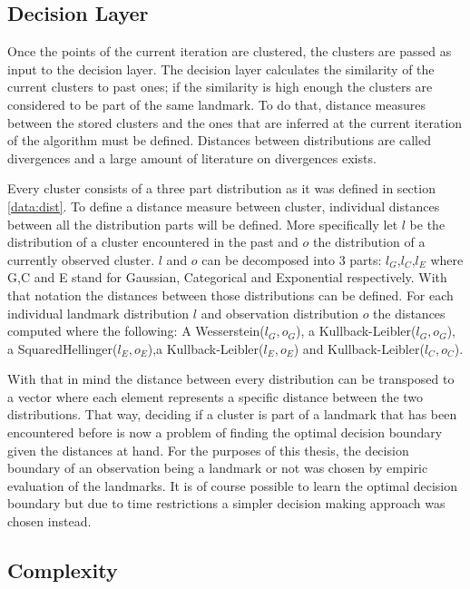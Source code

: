\documentclass[twoside,hidelinks]{article}
\begin{document}
\subsection{Decision Layer}

Once the points of the current iteration are clustered, the clusters are passed as input to the decision layer. The decision layer calculates the similarity of the current clusters to past ones; if the similarity is high enough the clusters are considered to be part of the same landmark. To do that, distance measures between the stored clusters and the ones that are inferred at the current iteration of the algorithm must be defined. Distances between distributions are called divergences and a large amount of literature on divergences exists.

Every cluster consists of a three part distribution as it was defined in section \ref{data:dist}. To define a distance measure between cluster, individual distances between all the distribution parts will be defined. More specifically let $l$ be the distribution of a cluster encountered in the past and $o$ the distribution of a currently observed cluster. $l$ and $o$ can be decomposed into 3 parts: $l_G$,$l_C$,$l_E$ where G,C and E stand for Gaussian, Categorical and Exponential respectively. With that notation the distances between those distributions can be defined. For each individual landmark distribution $l$ and observation distribution $o$ the distances computed where the following: A Wesserstein($l_G,o_G$), a Kullback-Leibler($l_G,o_G$), a SquaredHellinger($l_E,o_E$),a Kullback-Leibler($l_E,o_E$) and  Kullback-Leibler($l_C,o_C$).

With that in mind the distance between every distribution can be transposed to a vector where each element represents a specific distance between the two distributions. That way, deciding if a cluster is part of a landmark that has been encountered before is now a problem of finding the optimal decision boundary given the distances at hand. For the purposes of this thesis, the decision boundary of an observation being a landmark or not was chosen by empiric evaluation of the landmarks. It is of course possible to learn the optimal decision boundary but due to time restrictions a simpler decision making approach was chosen instead.

\subsection{Complexity}
\end{document}
